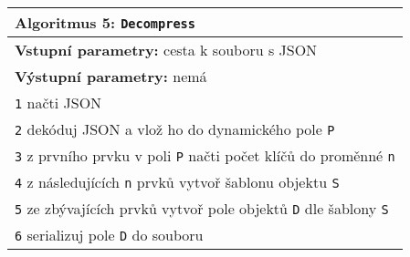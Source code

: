 \begin{table}[!h]
\centering
\begin{tabular}{|l|}
\hline
\textbf{Algoritmus 5:} \texttt{Decompress}\\
\hline
\textbf{Vstupní parametry:} cesta k souboru s JSON\\
\textbf{Výstupní parametry:} nemá\\
\hline
\texttt{1} načti JSON\\
\texttt{2} dekóduj JSON a vlož ho do dynamického pole \texttt{P}\\
\texttt{3} z prvního prvku v poli \texttt{P} načti počet klíčů do proměnné \texttt{n}\\
\texttt{4} z následujících \texttt{n} prvků vytvoř šablonu objektu \texttt{S}\\
\texttt{5} ze zbývajících prvků vytvoř pole objektů \texttt{D} dle šablony \texttt{S}\\
\texttt{6} serializuj pole \texttt{D} do souboru\\
\hline
\end{tabular}
\end{table}